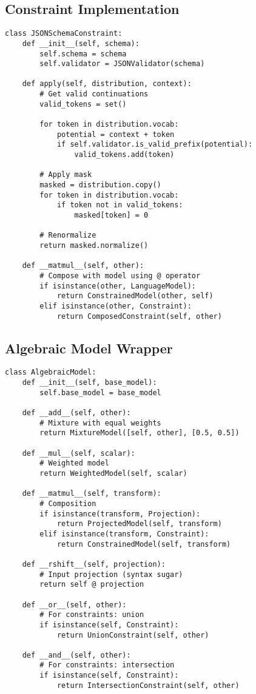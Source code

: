 \documentclass{article}
\theoremstyle{definition}
\begin{document}
\subsection{Constraint Implementation}

\begin{lstlisting}
class JSONSchemaConstraint:
    def __init__(self, schema):
        self.schema = schema
        self.validator = JSONValidator(schema)

    def apply(self, distribution, context):
        # Get valid continuations
        valid_tokens = set()

        for token in distribution.vocab:
            potential = context + token
            if self.validator.is_valid_prefix(potential):
                valid_tokens.add(token)

        # Apply mask
        masked = distribution.copy()
        for token in distribution.vocab:
            if token not in valid_tokens:
                masked[token] = 0

        # Renormalize
        return masked.normalize()

    def __matmul__(self, other):
        # Compose with model using @ operator
        if isinstance(other, LanguageModel):
            return ConstrainedModel(other, self)
        elif isinstance(other, Constraint):
            return ComposedConstraint(self, other)
\end{lstlisting}

\subsection{Algebraic Model Wrapper}

\begin{lstlisting}
class AlgebraicModel:
    def __init__(self, base_model):
        self.base_model = base_model

    def __add__(self, other):
        # Mixture with equal weights
        return MixtureModel([self, other], [0.5, 0.5])

    def __mul__(self, scalar):
        # Weighted model
        return WeightedModel(self, scalar)

    def __matmul__(self, transform):
        # Composition
        if isinstance(transform, Projection):
            return ProjectedModel(self, transform)
        elif isinstance(transform, Constraint):
            return ConstrainedModel(self, transform)

    def __rshift__(self, projection):
        # Input projection (syntax sugar)
        return self @ projection

    def __or__(self, other):
        # For constraints: union
        if isinstance(self, Constraint):
            return UnionConstraint(self, other)

    def __and__(self, other):
        # For constraints: intersection
        if isinstance(self, Constraint):
            return IntersectionConstraint(self, other)
\end{lstlisting}
\end{document}
